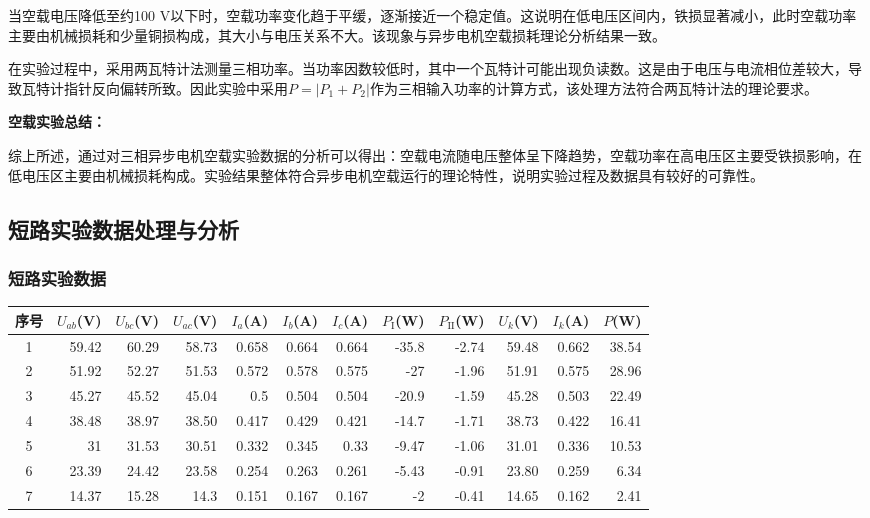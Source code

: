 \documentclass[12pt,a4paper]{article}
\begin{document}
当空载电压降低至约100 V以下时，空载功率变化趋于平缓，逐渐接近一个稳定值。这说明在低电压区间内，铁损显著减小，此时空载功率主要由机械损耗和少量铜损构成，其大小与电压关系不大。该现象与异步电机空载损耗理论分析结果一致。

在实验过程中，采用两瓦特计法测量三相功率。当功率因数较低时，其中一个瓦特计可能出现负读数。这是由于电压与电流相位差较大，导致瓦特计指针反向偏转所致。因此实验中采用$P = |P_1 + P_2|$作为三相输入功率的计算方式，该处理方法符合两瓦特计法的理论要求。

\textbf{空载实验总结：}

综上所述，通过对三相异步电机空载实验数据的分析可以得出：空载电流随电压整体呈下降趋势，空载功率在高电压区主要受铁损影响，在低电压区主要由机械损耗构成。实验结果整体符合异步电机空载运行的理论特性，说明实验过程及数据具有较好的可靠性。

\subsection{短路实验数据处理与分析}

\subsubsection{短路实验数据}

\begin{table}[H]
\centering
\small
\begin{tabular}{crrrrrrrr|rrr}
\toprule
序号 & $U_{ab}$(V) & $U_{bc}$(V) & $U_{ac}$(V) & $I_{a}$(A) & $I_{b}$(A) & $I_{c}$(A) & $P_{\text{I}}$(W) & $P_{\text{II}}$(W) & $U_{k}$(V) & $I_{k}$(A) & $P$(W) \\
\midrule
1 & 59.42 & 60.29 & 58.73 & 0.658 & 0.664 & 0.664 & -35.8 & -2.74 & 59.48 & 0.662 & 38.54 \\
2 & 51.92 & 52.27 & 51.53 & 0.572 & 0.578 & 0.575 & -27 & -1.96 & 51.91 & 0.575 & 28.96 \\
3 & 45.27 & 45.52 & 45.04 & 0.5 & 0.504 & 0.504 & -20.9 & -1.59 & 45.28 & 0.503 & 22.49 \\
4 & 38.48 & 38.97 & 38.50 & 0.417 & 0.429 & 0.421 & -14.7 & -1.71 & 38.73 & 0.422 & 16.41 \\
5 & 31 & 31.53 & 30.51 & 0.332 & 0.345 & 0.33 & -9.47 & -1.06 & 31.01 & 0.336 & 10.53 \\
6 & 23.39 & 24.42 & 23.58 & 0.254 & 0.263 & 0.261 & -5.43 & -0.91 & 23.80 & 0.259 & 6.34 \\
7 & 14.37 & 15.28 & 14.3 & 0.151 & 0.167 & 0.167 & -2 & -0.41 & 14.65 & 0.162 & 2.41 \\
\bottomrule
\end{tabular}
\end{table}
\end{document}
